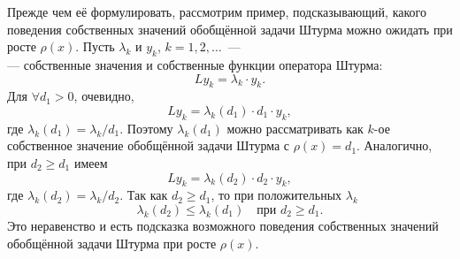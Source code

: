 Прежде чем её формулировать{\mb,} рассмотрим пример, подсказывающий{\mb,} какого поведения собственных значений обобщённой задачи Штурма можно ожидать при росте $\rho(x)$. Пусть $\lambda_k$ и $y_k$, $k=1,2,\ldots${\mb~---\\---}  собственные значения и собственные функции оператора Штурма:
\begin{equation*}
	L y_k=\lambda_k\cdot y_k.
\end{equation*}
Для $\forall d_1>0${\mb,} очевидно{\mb,}
\begin{equation*}
	L y_k=\lambda_k(d_1)\cdot d_1\cdot y_k,
\end{equation*}
где $\lambda_k(d_1)=\lambda_k/d_1$. Поэтому $\lambda_k(d_1)$ можно рассматривать как $k$-ое собственное значение обобщённой задачи Штурма с $\rho(x)=d_1$. Аналогично{\mb,} при $d_2\geqslant d_1$ имеем 
\begin{equation*}
	L y_k=\lambda_k(d_2)\cdot d_2\cdot y_k,
\end{equation*}
где $\lambda_k(d_2)=\lambda_k/d_2$. Так как $d_2\geqslant d_1$, то при положительных $\lambda_k$
\begin{equation*}
	\lambda_k(d_2)\leqslant\lambda_k(d_1)\quad\text{при }d_2\geqslant d_1.
\end{equation*}
Это неравенство и есть подсказка возможного поведения собственных значений обобщённой задачи Штурма при росте $\rho(x)$.

